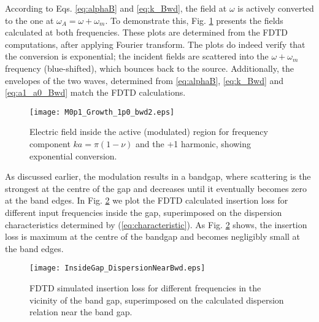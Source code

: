 \documentclass[journal]{IEEEtran}
\begin{document}
According to Eqs. \ref{eq:alphaB} and \ref{eq:k_Bwd}, the field at $\omega$ is actively converted to the one at $\omega_A=\omega+\omega_m$. To demonstrate this, Fig. \ref{fig:growth_Bwd} presents the fields calculated at both frequencies. These plots are determined from the FDTD computations, after applying Fourier transform. The plots do indeed verify that the conversion is exponential; the incident fields are scattered into the $\omega+\omega_m$ frequency (blue-shifted), which bounces back to the source. Additionally, the envelopes of the two waves, determined from \ref{eq:alphaB}, \ref{eq:k_Bwd} and \ref{eq:a1_a0_Bwd} match the FDTD calculations.

\begin{figure}
\centering
\texttt{[image: M0p1\_Growth\_1p0\_bwd2.eps]}
\caption{Electric field inside the active (modulated) region for frequency component $ka=\pi(1-\nu)$ and the +1 harmonic, showing exponential conversion.}
\label{fig:growth_Bwd}
\end{figure}

As discussed earlier, the modulation results in a bandgap, where scattering is the strongest at the centre of the gap and decreases until it eventually becomes zero at the band edges. In Fig. \ref{fig:InsertionLoss_Dispersion_Bwd} we plot the FDTD calculated insertion loss for different input frequencies inside the gap, superimposed on the dispersion characteristics determined by (\ref{eq:characteristic}). As Fig. \ref{fig:InsertionLoss_Dispersion_Bwd} shows, the insertion loss is maximum at the centre of the bandgap and becomes negligibly small at the band edges.
\begin{figure}
\centering
\texttt{[image: InsideGap\_DispersionNearBwd.eps]}
\caption{FDTD simulated insertion loss for different frequencies in the vicinity of the band gap, superimposed on the calculated dispersion relation near the band gap.}
\label{fig:InsertionLoss_Dispersion_Bwd}
\end{figure}





%
%
\end{document}
